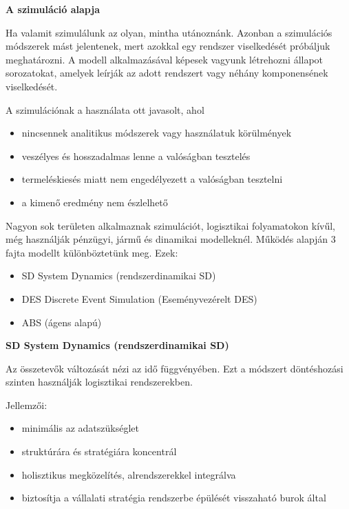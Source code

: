 

\textbf{A szimuláció alapja}

Ha valamit szimulálunk az olyan, mintha utánoznánk. Azonban a szimulációs módszerek mást jelentenek, mert azokkal egy rendszer viselkedését próbáljuk meghatározni. A modell alkalmazásával képesek vagyunk létrehozni állapot sorozatokat, amelyek leírják az adott rendszert vagy néhány komponensének viselkedését. 

A szimulációnak a használata ott javasolt, ahol

\begin{itemize}
	\item nincsennek analitikus módszerek vagy használatuk körülmények
	\item veszélyes és hosszadalmas lenne a valóságban tesztelés
	\item termeléskiesés miatt nem engedélyezett a valóságban tesztelni
	\item a kimenő eredmény nem észlelhető
\end{itemize}

Nagyon sok területen alkalmaznak szimulációt, logisztikai folyamatokon kívűl, még használják pénzügyi, jármű és dinamikai modelleknél. 
Működés alapján 3 fajta modellt különböztetünk meg.
Ezek:

\begin{itemize}
	\item SD System Dynamics (rendszerdinamikai SD)
	\item  DES Discrete Event Simulation (Eseményvezérelt DES)
	\item  ABS (ágens alapú)
\end{itemize}

\textbf{SD System Dynamics (rendszerdinamikai SD)}

Az összetevők változását nézi az idő függvényében. Ezt a módszert döntéshozási szinten használják logisztikai rendszerekben. 

Jellemzői:

\begin{itemize}
	\item minimális az adatszükséglet
	\item  struktúrára és stratégiára koncentrál
	\item  holisztikus megközelítés, alrendszerekkel integrálva
	\item biztosítja a vállalati stratégia rendszerbe épülését visszaható burok által
\end{itemize}

